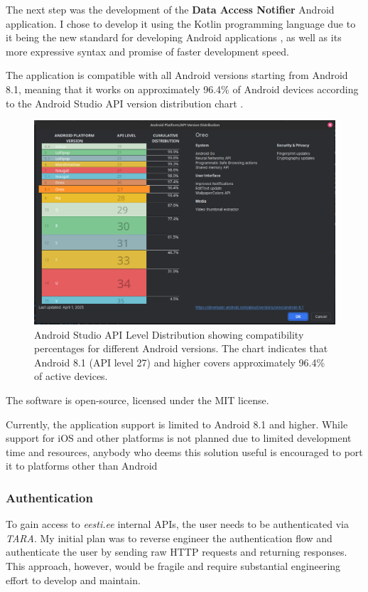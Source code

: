 The next step was the development of the \textbf{Data Access Notifier} Android application. I chose to develop it using the Kotlin programming language due to it being the new standard for developing Android applications \cite{kotlin-first}, as well as its more expressive syntax and promise of faster development speed.

The application is compatible with all Android versions starting from Android 8.1, meaning that it works on approximately 96.4\% of Android devices according to the Android Studio API version distribution chart \cite{android-api-distribution,android-studio-screenshot}.

\begin{figure}[H]
\centering
\includegraphics[width=450px]{english/figures/Screenshot from 2025-08-04 19-37-39.png}
\caption{Android Studio API Level Distribution showing compatibility percentages for different Android versions. The chart indicates that Android 8.1 (API level 27) and higher covers approximately 96.4\% of active devices.}
\label{fig:android-api-distribution}
\end{figure}

The software is open-source, licensed under the MIT license.

Currently, the application support is limited to Android 8.1 and higher. While support for iOS and other platforms is not planned due to limited development time and resources, anybody who deems this solution useful is encouraged to port it to platforms other than Android

\subsubsection{Authentication}
To gain access to \textit{eesti.ee} internal APIs, the user needs to be authenticated via \textit{TARA}. My initial plan was to reverse engineer the authentication flow and authenticate the user by sending raw HTTP requests and returning responses. This approach, however, would be fragile and require substantial engineering effort to develop and maintain.

